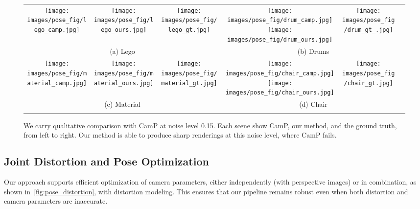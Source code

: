 


\begin{figure*}[t]
    \centering
    \setlength{\tabcolsep}{0.1em} 
    \renewcommand{\arraystretch}{0.91}
    \begin{tabular}{cccccc}
        \texttt{[image: images/pose\_fig/lego\_camp.jpg]} &  
        \texttt{[image: images/pose\_fig/lego\_ours.jpg]} &  
        \texttt{[image: images/pose\_fig/lego\_gt.jpg]} &  
        \texttt{[image: images/pose\_fig/drum\_camp.jpg]} 
        \texttt{[image: images/pose\_fig/drum\_ours.jpg]} &  
        \texttt{[image: images/pose\_fig/drum\_gt\_.jpg]} 
        \\
        \multicolumn{3}{c}{(a) Lego} & \multicolumn{3}{c}{(b) Drums}
        \\
        \texttt{[image: images/pose\_fig/material\_camp.jpg]} &  
        \texttt{[image: images/pose\_fig/material\_ours.jpg]} &  
        \texttt{[image: images/pose\_fig/material\_gt.jpg]} &  
        \texttt{[image: images/pose\_fig/chair\_camp.jpg]} 
        \texttt{[image: images/pose\_fig/chair\_ours.jpg]} &  
        \texttt{[image: images/pose\_fig/chair\_gt.jpg]} 
        \\
        \multicolumn{3}{c}{(c) Material} & \multicolumn{3}{c}{(d) Chair}
        \\
        &&&&&\\
    \end{tabular}
     \caption{We carry qualitative comparison with CamP at noise level 0.15. Each scene show CamP, our method, and the ground truth, from left to right. Our method is able to produce sharp renderings at this noise level, where CamP fails.}
    \label{fig:qualitative-perturb}
\end{figure*}

\subsection{Joint Distortion and Pose Optimization}
\label{sec:2.2}
Our approach supports efficient optimization of camera parameters, either independently (with perspective images) or in combination, as shown in~\cref{fig:pose_distortion}, with distortion modeling. This ensures that our pipeline remains robust even when both distortion and camera parameters are inaccurate.

